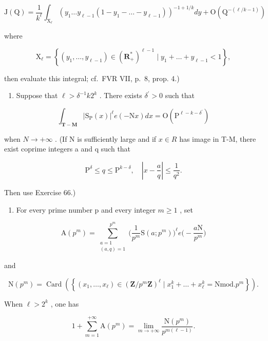 \[
\mathrm{J} (\mathrm{Q}) = \frac {1}{k ^ {\ell}} \int_ {\mathrm{X} _ {\ell}} (y _ {1} \dots y _ {\ell - 1} (1 - y _ {1} - \dots - y _ {\ell - 1})) ^ {- 1 + 1 / k} d y + \mathrm{O} (\mathrm{Q} ^ {- (\ell / k - 1)})
\]

where

\[
\mathrm{X} _ {\ell} = \left\{\left(y _ {1}, \dots , y _ {\ell - 1}\right) \in \left(\mathbf {R} _ {+} ^ {*}\right) ^ {\ell - 1} \mid y _ {1} + \dots + y _ {\ell - 1} <   1 \right\},
\]

then evaluate this integral; cf.~FVR VII, p.~8, prop. 4.)

\begin{enumerate}
\def\labelenumi{\alph{enumi})}
\setcounter{enumi}{4}
\tightlist
\item
  Suppose that \(\ell >\delta^{-1}k2^{k}\) . There exists \(\delta^{\prime} > 0\) such that
\end{enumerate}

\[
\int_ {\mathbf {T - M}} | \mathrm{S} _ {\mathrm{P}} (x) | ^ {\ell} e (- \mathrm{N} x) d x = \mathrm{O} (\mathrm{P} ^ {\ell - k - \delta^ {\prime}})
\]

when \(N \rightarrow +\infty\) . (If N is sufficiently large and if \(x \in R\) has image in T-M, there exist coprime integers a and q such that

\[
\mathrm{P} ^ {\delta} \leqslant q \leqslant \mathrm{P} ^ {k - \delta}, \quad \left| x - \frac {a}{q} \right| \leqslant \frac {1}{q ^ {2}}.
\]

Then use Exercise 66.)

\begin{enumerate}
\def\labelenumi{\alph{enumi})}
\setcounter{enumi}{5}
\tightlist
\item
  For every prime number p and every integer \(m \geqslant 1\) , set
\end{enumerate}

\[
\mathrm{A}(p^{m}) = \sum_{\substack{a = 1\\ (a,q) = 1}}^{p^{m}}\Big(\frac{1}{p^{m}}\mathrm{S}(a;p^{m})\Big)^{\ell}e\Big(-\frac{a\mathrm{N}}{p^{m}}\Big)
\]

and

\[
\mathrm{N} (p ^ {m}) = \operatorname{Card} \left(\left\{\left(x _ {1}, \dots , x _ {\ell}\right) \in (\mathbf {Z} / p ^ {m} \mathbf {Z}) ^ {\ell} \mid x _ {1} ^ {k} + \dots + x _ {\ell} ^ {k} = \mathrm{N mod.} p ^ {m} \right\}\right).
\]

When \(\ell > 2^k\) , one has

\[
1 + \sum_ {m = 1} ^ {+ \infty} \mathrm{A} (p ^ {m}) = \lim _ {m \to + \infty} \frac {\mathrm{N} (p ^ {m})}{p ^ {m (\ell - 1)}}.
\]

